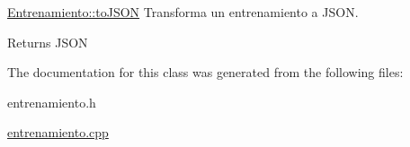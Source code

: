 \mbox{\hyperlink{classEntrenamiento_a4a0e1dcb5ff226db68e8621a7102ee12}{Entrenamiento\+::to\+J\+S\+ON}} Transforma un entrenamiento a J\+S\+ON. 

\begin{DoxyReturn}{Returns}
J\+S\+ON 
\end{DoxyReturn}


The documentation for this class was generated from the following files\+:\begin{DoxyCompactItemize}
\item 
entrenamiento.\+h\item 
\mbox{\hyperlink{entrenamiento_8cpp}{entrenamiento.\+cpp}}\end{DoxyCompactItemize}
